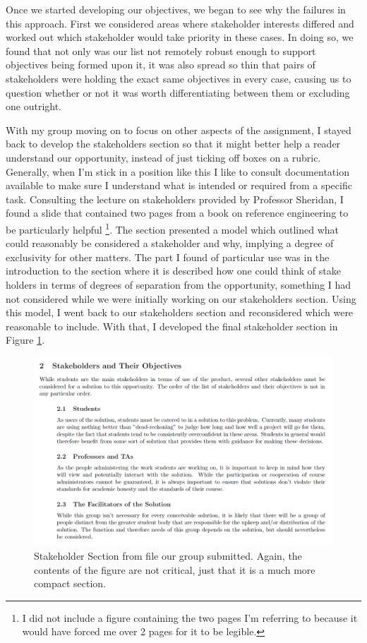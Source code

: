 \documentclass[11pt]{article}
\begin{document}
    Once we started developing our objectives, we began to see why the failures in this approach. First we considered areas where stakeholder interests differed and worked out which stakeholder would take priority in these cases. In doing so, we found that not only was our list not remotely robust enough to support objectives being formed upon it, it was also spread so thin that pairs of stakeholders were holding the exact same objectives in every case, causing us to question whether or not it was worth differentiating between them or excluding one outright. 
    
    With my group moving on to focus on other aspects of the assignment, I stayed back to develop the stakeholders section so that it might better help a reader understand our opportunity, instead of just ticking off boxes on a rubric. Generally, when I'm stick in a position like this I like to consult documentation available to make sure I understand what is intended or required from a specific task. Consulting the lecture on stakeholders provided by Professor Sheridan, I found a slide that contained two pages from a book on reference engineering to be particularly helpful \cite{book1}\footnote{I did not include a figure containing the two pages I'm referring to because it would have forced me over 2 pages for it to be legible.}. The section presented a model which outlined what could reasonably be considered a stakeholder and why, implying a degree of exclusivity for other matters. The part I found of particular use was in the introduction to the section where it is described how one could think of stake holders in terms of degrees of separation from the opportunity, something I had not considered while we were initially working on our stakeholders section. Using this model, I went back to our stakeholders section and reconsidered which were reasonable to include. With that, I developed the final stakeholder section in Figure \ref{finalSection}.
    
    \begin{figure}[H]
        \centering\includegraphics{FinalStakholders.PNG}
        \caption{Stakeholder Section from file our group submitted. Again, the contents of the figure are not critical, just that it is a much more compact section.}
        \label{finalSection}
    \end{figure}
    
\end{document}
